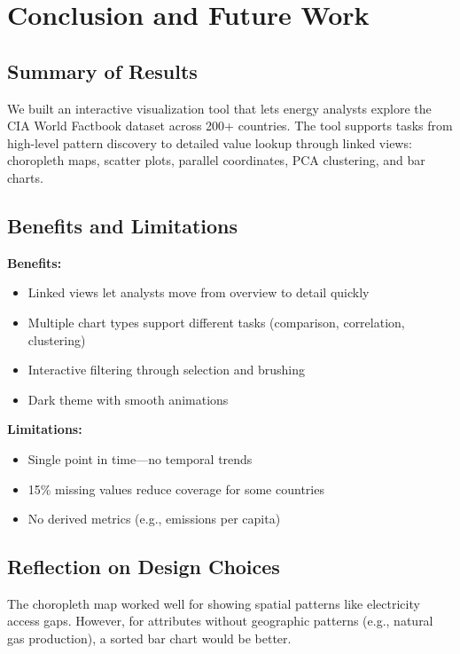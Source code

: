 \documentclass[conference]{IEEEtran}
\begin{document}
{\section{Conclusion and Future Work}

\subsection{Summary of Results}

We built an interactive visualization tool that lets energy analysts explore the CIA World Factbook dataset across 200+ countries. The tool supports tasks from high-level pattern discovery to detailed value lookup through linked views: choropleth maps, scatter plots, parallel coordinates, PCA clustering, and bar charts.

\subsection{Benefits and Limitations}

\textbf{Benefits:}
\begin{itemize}
    \item Linked views let analysts move from overview to detail quickly
    \item Multiple chart types support different tasks (comparison, correlation, clustering)
    \item Interactive filtering through selection and brushing
    \item Dark theme with smooth animations
\end{itemize}

\textbf{Limitations:}
\begin{itemize}
    \item Single point in time---no temporal trends
    \item 15\% missing values reduce coverage for some countries
    \item No derived metrics (e.g., emissions per capita)
\end{itemize}

\subsection{Reflection on Design Choices}

The choropleth map worked well for showing spatial patterns like electricity access gaps. However, for attributes without geographic patterns (e.g., natural gas production), a sorted bar chart would be better.

}
\end{document}
